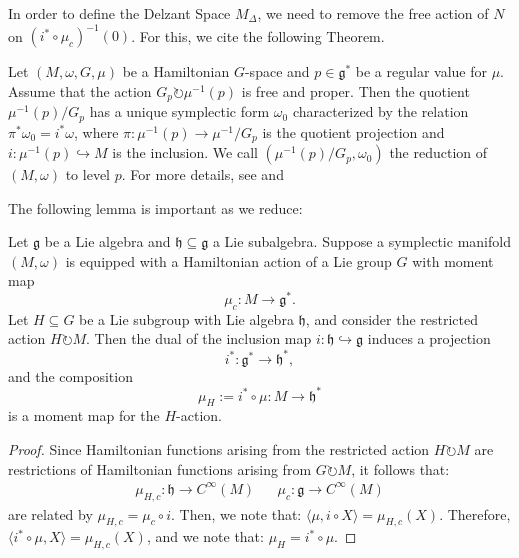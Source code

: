 \begin{remark}
In order to define the Delzant Space $M_{\Delta}$, we need to remove the free action of $N$ on $(i^{*} \circ \mu_{c})^{-1}(0)$. For this, we cite the following Theorem. 
\end{remark}

\begin{theorem} 
\label{Marsden-Weinstein}
Let $(M, \omega, G, \mu)$ be a Hamiltonian $G$-space and $p \in \mathfrak{g}^*$ be a regular value for $\mu$. Assume that the action $G_p \circlearrowright \mu^{-1}(p)$ is free and proper. Then the quotient $\mu^{-1}(p)/G_p$ has a unique symplectic form $\omega_0$ characterized by the relation $\pi^*\omega_0 = i^*\omega$, where $\pi: \mu^{-1}(p) \rightarrow \mu^{-1}/G_p$ is the quotient projection and $i: \mu^{-1}(p) \hookrightarrow M$ is the inclusion. We call $(\mu^{-1}(p)/G_p, \omega_0)$ the reduction of $(M, \omega)$ to level $p$. For more details, see \textcite{MarsdenWeinstein1974} and \textcite{Terek2020}
\end{theorem}

The following lemma is important as we reduce:

\begin{lemma}
\label{MomentMapLieSubAlgebra}
Let $\mathfrak{g}$ be a Lie algebra and $\mathfrak{h} \subseteq \mathfrak{g}$ a Lie subalgebra. Suppose a symplectic manifold $(M, \omega)$ is equipped with a Hamiltonian action of a Lie group $G$ with moment map 
\[
\mu_c: M \to \mathfrak{g}^*.
\]
Let $H \subseteq G$ be a Lie subgroup with Lie algebra $\mathfrak{h}$, and consider the restricted action $H \circlearrowright M$. Then the dual of the inclusion map $i: \mathfrak{h} \hookrightarrow \mathfrak{g}$ induces a projection
\[
i^*: \mathfrak{g}^* \to \mathfrak{h}^*,
\]
and the composition
\[
\mu_H := i^* \circ \mu: M \to \mathfrak{h}^*
\]
is a moment map for the $H$-action.
\end{lemma}

\begin{proof}
Since Hamiltonian functions arising from the restricted action $H \circlearrowright M$ are restrictions of Hamiltonian functions arising from $G \circlearrowright M$, it follows that:
\begin{align}
\mu_{H, c}: \mathfrak{h} \to C^{\infty}(M) &&  \mu_{c}: \mathfrak{g} \to C^{\infty}(M) 
\end{align}
\noindent are related by $\mu_{H, c} = \mu_{c} \circ i$. Then, we note that: $\langle \mu, i \circ X \rangle = \mu_{H,c}(X)$. Therefore, $\langle i^{*} \circ \mu, X \rangle = \mu_{H,c}(X)$, and we note that: $\mu_{H} = i^{*} \circ \mu$. 
\end{proof}

